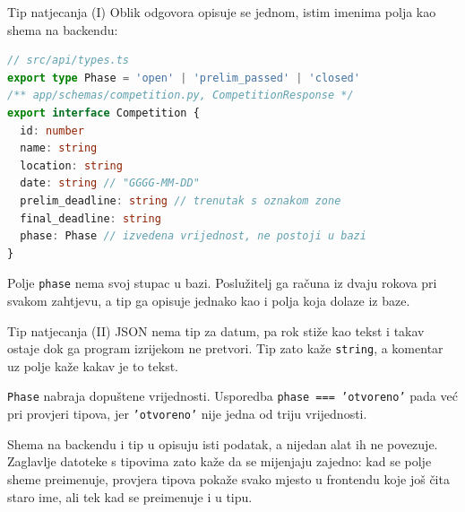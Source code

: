 \begin{frame}[fragile]{Tip natjecanja (I)}
Oblik odgovora opisuje se jednom, istim imenima polja kao shema na backendu:

\begin{lstlisting}[language=typescript]
// src/api/types.ts
export type Phase = 'open' | 'prelim_passed' | 'closed'
/** app/schemas/competition.py, CompetitionResponse */
export interface Competition {
  id: number
  name: string
  location: string
  date: string // "GGGG-MM-DD"
  prelim_deadline: string // trenutak s oznakom zone
  final_deadline: string
  phase: Phase // izvedena vrijednost, ne postoji u bazi
}
\end{lstlisting}

Polje \texttt{phase} nema svoj stupac u bazi. Poslužitelj ga računa iz dvaju rokova pri svakom zahtjevu, a tip ga opisuje jednako kao i polja koja dolaze iz baze.
\end{frame}

\begin{frame}{Tip natjecanja (II)}
JSON nema tip za datum, pa rok stiže kao tekst i takav ostaje dok ga program izrijekom ne pretvori. Tip zato kaže \texttt{string}, a komentar uz polje kaže kakav je to tekst.

\vspace{0.9em}
\texttt{Phase} nabraja dopuštene vrijednosti. Usporedba \texttt{phase === 'otvoreno'} pada već pri provjeri tipova, jer \texttt{'otvoreno'} nije jedna od triju vrijednosti.

\vspace{0.9em}
Shema na backendu i tip u  opisuju isti podatak, a nijedan alat ih ne povezuje. Zaglavlje datoteke s tipovima zato kaže da se mijenjaju zajedno: kad se polje sheme preimenuje, provjera tipova pokaže svako mjesto u frontendu koje još čita staro ime, ali tek kad se preimenuje i u tipu.
\end{frame}

